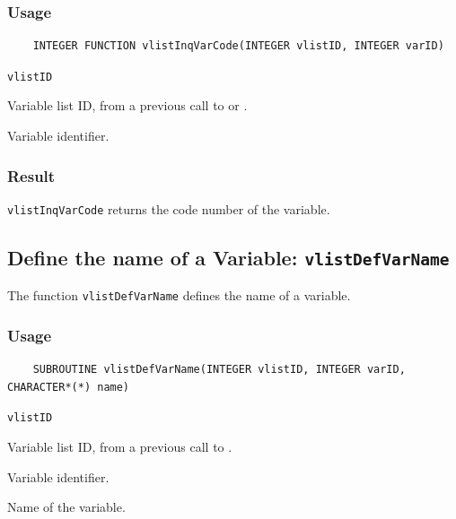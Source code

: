 \subsubsection*{Usage}

\begin{verbatim}
    INTEGER FUNCTION vlistInqVarCode(INTEGER vlistID, INTEGER varID)
\end{verbatim}

\hspace*{4mm}\begin{minipage}[]{15cm}
\begin{deflist}{\texttt{vlistID}\ }
\item[\texttt{vlistID}]
Variable list ID, from a previous call to {} or {}.
\item[\texttt{varID}]
Variable identifier.

\end{deflist}
\end{minipage}

\subsubsection*{Result}

{\texttt{vlistInqVarCode}} returns the code number of the variable.



\subsection{Define the name of a Variable: \texttt{vlistDefVarName}}
\label{vlistDefVarName}

The function {\texttt{vlistDefVarName}} defines the name of a variable.

\subsubsection*{Usage}

\begin{verbatim}
    SUBROUTINE vlistDefVarName(INTEGER vlistID, INTEGER varID, CHARACTER*(*) name)
\end{verbatim}

\hspace*{4mm}\begin{minipage}[]{15cm}
\begin{deflist}{\texttt{vlistID}\ }
\item[\texttt{vlistID}]
Variable list ID, from a previous call to {}.
\item[\texttt{varID}]
Variable identifier.
\item[\texttt{name}]
Name of the variable.

\end{deflist}
\end{minipage}


